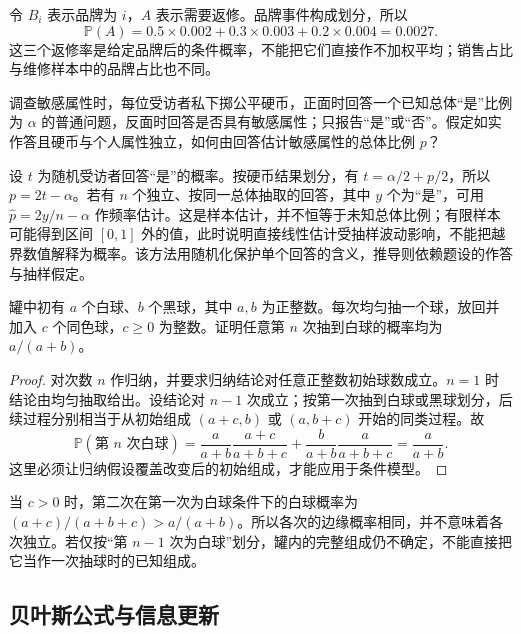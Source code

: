 \begin{solve}
令 $B_i$ 表示品牌为 $i$，$A$ 表示需要返修。品牌事件构成划分，所以
\[
 \mathbb P(A)=0.5\times0.002+0.3\times0.003+0.2\times0.004
 =0.0027.
\]
这三个返修率是给定品牌后的条件概率，不能把它们直接作不加权平均；销售占比与维修样本中的品牌占比也不同。
\end{solve}

\begin{example}
\label{ex:study-randomized-response}
调查敏感属性时，每位受访者私下掷公平硬币，正面时回答一个已知总体“是”比例为 $\alpha$ 的普通问题，反面时回答是否具有敏感属性；只报告“是”或“否”。假定如实作答且硬币与个人属性独立，如何由回答估计敏感属性的总体比例 $p$？
\end{example}

\begin{solve}
设 $t$ 为随机受访者回答“是”的概率。按硬币结果划分，有 $t=\alpha/2+p/2$，所以 $p=2t-\alpha$。若有 $n$ 个独立、按同一总体抽取的回答，其中 $y$ 个为“是”，可用 $\widehat p=2y/n-\alpha$ 作频率估计。这是样本估计，并不恒等于未知总体比例；有限样本可能得到区间 $[0,1]$ 外的值，此时说明直接线性估计受抽样波动影响，不能把越界数值解释为概率。该方法用随机化保护单个回答的含义，推导则依赖题设的作答与抽样假定。
\end{solve}

\begin{example}
\label{ex:study-polya-urn}
罐中初有 $a$ 个白球、$b$ 个黑球，其中 $a,b$ 为正整数。每次均匀抽一个球，放回并加入 $c$ 个同色球，$c\ge0$ 为整数。证明任意第 $n$ 次抽到白球的概率均为 $a/(a+b)$。
\end{example}

\begin{proof}
对次数 $n$ 作归纳，并要求归纳结论对任意正整数初始球数成立。$n=1$ 时结论由均匀抽取给出。设结论对 $n-1$ 次成立；按第一次抽到白球或黑球划分，后续过程分别相当于从初始组成 $(a+c,b)$ 或 $(a,b+c)$ 开始的同类过程。故
\[
 \mathbb P(\text{第 }n\text{ 次白球})
 =\frac{a}{a+b}\frac{a+c}{a+b+c}
  +\frac{b}{a+b}\frac{a}{a+b+c}
 =\frac{a}{a+b}.
\]
这里必须让归纳假设覆盖改变后的初始组成，才能应用于条件模型。
\end{proof}

当 $c>0$ 时，第二次在第一次为白球条件下的白球概率为 $(a+c)/(a+b+c)>a/(a+b)$。所以各次的边缘概率相同，并不意味着各次独立。若仅按“第 $n-1$ 次为白球”划分，罐内的完整组成仍不确定，不能直接把它当作一次抽球时的已知组成。

\subsection{贝叶斯公式与信息更新}
\label{subsec:study-bayes-formula}

